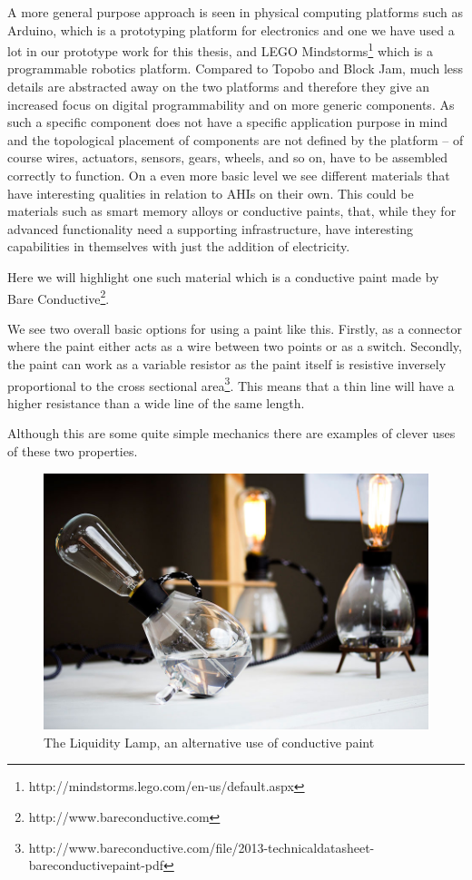 A more general purpose approach is seen in physical computing platforms such as Arduino, which is a prototyping platform for electronics and one we have used a lot in our prototype work for this thesis, and LEGO Mindstorms\footnote{http://mindstorms.lego.com/en-us/default.aspx} which is a programmable robotics platform.
Compared to Topobo and Block Jam, much less details are abstracted away on the two platforms and therefore they give an increased focus on digital programmability and on more generic components.
As such a specific component does not have a specific application purpose in mind and the topological placement of components are not defined by the platform -- of course wires, actuators, sensors, gears, wheels, and so on, have to be assembled correctly to function.
\blank
On a even more basic level we see different materials that have interesting qualities in relation to AHIs on their own.
This could be materials such as smart memory alloys or conductive paints, that, while they for advanced functionality need a supporting infrastructure, have interesting capabilities in themselves with just the addition of electricity.

Here we will highlight one such material which is a conductive paint made by Bare Conductive\footnote{http://www.bareconductive.com}.

We see two overall basic options for using a paint like this.
Firstly, as a connector where the paint either acts as a wire between two points or as a switch.
Secondly, the paint can work as a variable resistor as the paint itself is resistive inversely proportional to the cross sectional area\footnote{http://www.bareconductive.com/file/2013-technicaldatasheet-bareconductivepaint-pdf}. 
This means that a thin line will have a higher resistance than a wide line of the same length.

Although this are some quite simple mechanics there are examples of clever uses of these two properties.

\begin{figure}[h]
  \centering
  \begin{minipage}[b]{.8\textwidth}
    \centering
    \includegraphics[width=.7\linewidth]{figures/proto3/liquidity_lamp}
	\caption{The Liquidity Lamp, an alternative use of conductive paint}
   \label{liquidity_lamp}
   \end{minipage}
\end{figure}

